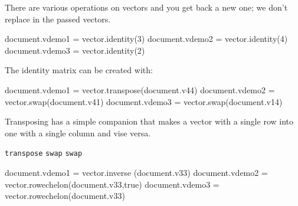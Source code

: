 \typebuffer[option=TEX] \getbuffer

There are various operations on vectors and you get back a new one; we don't
replace in the passed vectors.

\startlinecorrection
{} {}
  {} {\hbox{}}
  {} {\hbox{}}
  {} {\hbox{}}
\stopcombination
\stoplinecorrection

\startbuffer
\startluacode
document.vdemo1 = vector.identity(3)
document.vdemo2 = vector.identity(4)
document.vdemo3 = vector.identity(2)
\stopluacode
\stopbuffer

The identity matrix can be created with:

\typebuffer[option=TEX] \getbuffer

\startlinecorrection
{} {\hbox{}}
  {} {\hbox{}}
  {} {\hbox{}}
\stopcombination
\stoplinecorrection

\startbuffer
\startluacode
document.vdemo1 = vector.transpose(document.v44)
document.vdemo2 = vector.swap(document.v41)
document.vdemo3 = vector.swap(document.v14)
\stopluacode
\stopbuffer

\typebuffer[option=TEX] \getbuffer

Transposing has a simple companion that makes a vector with a single row into one
with a single column and vise versa.

\startlinecorrection
{} {}
    {} {\hbox{\tt transpose}}
    {} {}
    {} {\hbox{\tt swap}}
    {} {}
    {} {\hbox{\tt swap}}
\stopcombination
\stoplinecorrection

\startbuffer
\startluacode
document.vdemo1 = vector.inverse   (document.v33)
document.vdemo2 = vector.rowechelon(document.v33,true)
document.vdemo3 = vector.rowechelon(document.v33)
\stopluacode
\stopbuffer

\typebuffer[option=TEX] \getbuffer

